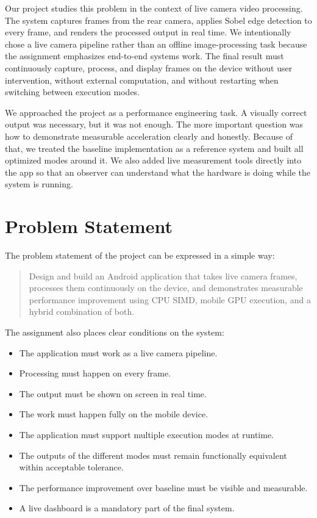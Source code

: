 \documentclass[12pt,a4paper]{article}
\begin{document}
Our project studies this problem in the context of live camera video processing. The system captures frames from the rear camera, applies Sobel edge detection to every frame, and renders the processed output in real time. We intentionally chose a live camera pipeline rather than an offline image-processing task because the assignment emphasizes end-to-end systems work. The final result must continuously capture, process, and display frames on the device without user intervention, without external computation, and without restarting when switching between execution modes.

We approached the project as a performance engineering task. A visually correct output was necessary, but it was not enough. The more important question was how to demonstrate measurable acceleration clearly and honestly. Because of that, we treated the baseline implementation as a reference system and built all optimized modes around it. We also added live measurement tools directly into the app so that an observer can understand what the hardware is doing while the system is running.

\section{Problem Statement}

The problem statement of the project can be expressed in a simple way:

\begin{quote}
Design and build an Android application that takes live camera frames, processes them continuously on the device, and demonstrates measurable performance improvement using CPU SIMD, mobile GPU execution, and a hybrid combination of both.
\end{quote}

The assignment also places clear conditions on the system:

\begin{itemize}
\item The application must work as a live camera pipeline.
\item Processing must happen on every frame.
\item The output must be shown on screen in real time.
\item The work must happen fully on the mobile device.
\item The application must support multiple execution modes at runtime.
\item The outputs of the different modes must remain functionally equivalent within acceptable tolerance.
\item The performance improvement over baseline must be visible and measurable.
\item A live dashboard is a mandatory part of the final system.
\end{itemize}
\end{document}
